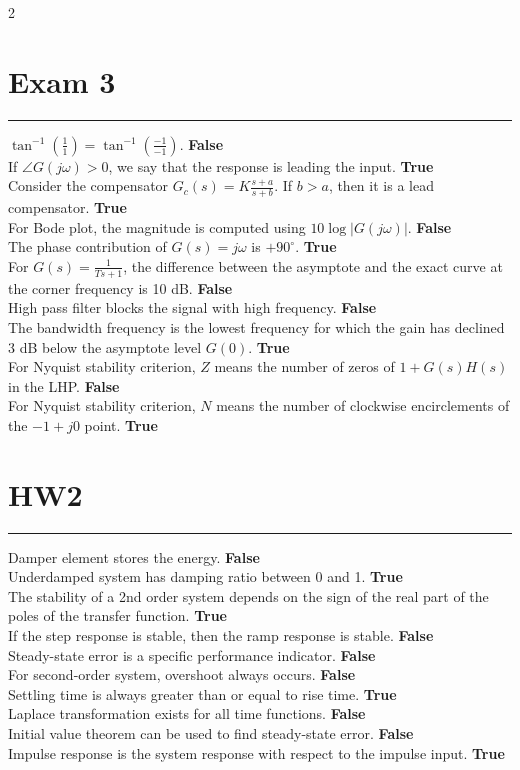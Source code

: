 \documentclass[letterpaper,10pt]{article}
\let\oldsection\section
\renewcommand{\section}[1]{%
\vspace{-1em}
  \oldsection{#1}%
  \par\vspace{-2em}%
  \noindent\rule{0.5\textwidth}{0.5pt}%
  \vspace{0em}%
}
\begin{document}
\begin{multicols}{2}
\section{Exam 3}
$\tan^{-1}\left(\frac{1}{1}\right) = \tan^{-1}\left(\frac{-1}{-1}\right)$. \textbf{False}\\
If $\angle G(j\omega) > 0$, we say that the response is leading the input. \textbf{True}\\
Consider the compensator $G_c(s) = K\frac{s + a}{s + b}$. If $b > a$, then it is a lead compensator. \textbf{True}\\
For Bode plot, the magnitude is computed using $10 \log |G(j\omega)|$. \textbf{False}\\
The phase contribution of $G(s) = j\omega$ is $+90^\circ$. \textbf{True}\\
For $G(s) = \frac{1}{Ts + 1}$, the difference between the asymptote and the exact curve at the corner frequency is 10 dB. \textbf{False}\\
High pass filter blocks the signal with high frequency. \textbf{False}\\
The bandwidth frequency is the lowest frequency for which the gain has declined 3 dB below the asymptote level $G(0)$. \textbf{True}\\
For Nyquist stability criterion, $Z$ means the number of zeros of $1 + G(s)H(s)$ in the LHP. \textbf{False}\\
For Nyquist stability criterion, $N$ means the number of clockwise encirclements of the $-1 + j0$ point. \textbf{True}

\section{HW2} \vspace{-0em}
Damper element stores the energy. \textbf{False}\\
Underdamped system has damping ratio between 0 and 1. \textbf{True}\\
The stability of a 2nd order system depends on the sign of the real part of the poles of the transfer function. \textbf{True}\\
If the step response is stable, then the ramp response is stable. \textbf{False}\\
Steady-state error is a specific performance indicator. \textbf{False}\\
For second-order system, overshoot always occurs. \textbf{False}\\
Settling time is always greater than or equal to rise time. \textbf{True}\\
Laplace transformation exists for all time functions. \textbf{False}\\
Initial value theorem can be used to find steady-state error. \textbf{False}\\
Impulse response is the system response with respect to the impulse input. \textbf{True}


\end{multicols}
\end{document}
